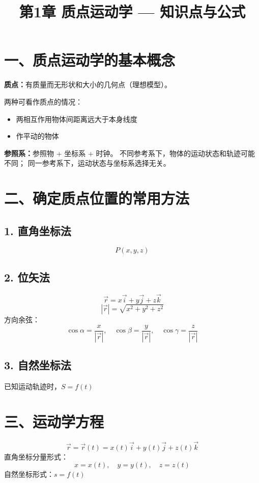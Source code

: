 \documentclass{ctexart}
\title{\textbf{第1章 质点运动学} --- 知识点与公式}
\author{}
\date{}
\begin{document}
\maketitle

\section*{一、质点运动学的基本概念}

\textbf{质点：}有质量而无形状和大小的几何点（理想模型）。

两种可看作质点的情况：
\begin{itemize}
  \item 两相互作用物体间距离远大于本身线度
  \item 作平动的物体
\end{itemize}

\textbf{参照系：}参照物 + 坐标系 + 时钟。
不同参考系下，物体的运动状态和轨迹可能不同；
同一参考系下，运动状态与坐标系选择无关。

\section*{二、确定质点位置的常用方法}

\subsection*{1. 直角坐标法}
\[
P(x, y, z)
\]

\subsection*{2. 位矢法}
\[
\vec{r} = x\vec{i} + y\vec{j} + z\vec{k}
\]
\[
|\vec{r}| = \sqrt{x^{2} + y^{2} + z^{2}}
\]
方向余弦：
\[
\cos\alpha = \frac{x}{|\vec{r}|},\quad
\cos\beta = \frac{y}{|\vec{r}|},\quad
\cos\gamma = \frac{z}{|\vec{r}|}
\]

\subsection*{3. 自然坐标法}
已知运动轨迹时，$S = f(t)$

\section*{三、运动学方程}
\[
\vec{r} = \vec{r}(t) = x(t)\vec{i} + y(t)\vec{j} + z(t)\vec{k}
\]
直角坐标分量形式：
\[
x = x(t),\quad y = y(t),\quad z = z(t)
\]
自然坐标形式：$s = f(t)$
\end{document}
